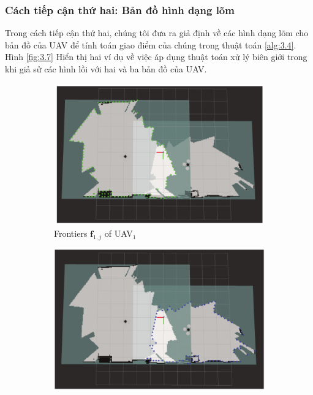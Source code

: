 \documentclass[11pt,openany]{book}
\begin{document}
\begin{algorimth}[H]
\subsubsection{Cách tiếp cận thứ hai: Bản đồ hình dạng lõm}
Trong cách tiếp cận thứ hai, chúng tôi đưa ra giả định về các hình dạng lõm cho bản đồ của UAV để tính toán giao điểm của chúng trong thuật toán \ref{alg:3.4}. Hình \ref{fig:3.7} Hiển thị hai ví dụ về việc áp dụng thuật toán xử lý biên giới trong khi giả sử các hình lồi với hai và ba bản đồ của UAV.
\begin{figure}[H]
    \centering
    \begin{subfigure}[H]{0.6\linewidth}
        \centering
        \includegraphics[width=\linewidth]{assets/3_5_a.png}
        \caption{{Frontiers $\mathbf{f}_{1,j}$ of UAV$_1$}}
        \label{fig:3.5a}
    \end{subfigure}
    \begin{subfigure}[H]{0.6\linewidth}
        \centering
        \includegraphics[width=\linewidth]{assets/3_5_b.png}

\end{subfigure}
\end{figure}
\end{algorimth}
\end{document}
